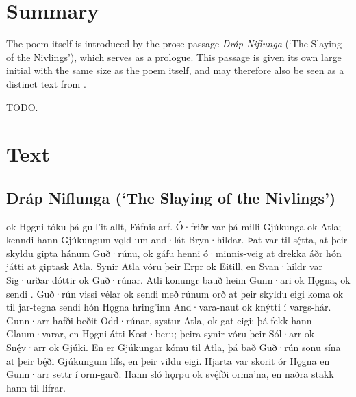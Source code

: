 \section{Summary}

The poem itself is introduced by the prose passage \emph{Dráp Niflunga} (‘The Slaying of the Nivlings’), which serves as a prologue.  This passage is given its own large initial with the same size as the poem itself, and may therefore also be seen as a distinct text from \GudrunTwo.

TODO.

\sectionline

\newpage

\section{Text}

\subsection{Dráp Niflunga (‘The Slaying of the Nivlings’)}

\bpg\bpa%
%
 ok Hǫgni tóku þá gull’it allt, Fáfnis arf. Ó·friðr var þá milli Gjúkunga ok Atla; kenndi hann Gjúkungum vǫld um and·lát Bryn·hildar. Þat var til sę́tta, at þeir skyldu gipta hánum Guð·rúnu, ok gáfu henni ó·minnis-veig at drekka áðr hón játti at giptask Atla. Synir Atla vóru þeir Erpr ok Eitill, en Svan·hildr var Sig·urðar dóttir ok Guð·rúnar. Atli konungr bauð heim Gunn·ari ok Hǫgna, ok sendi .  Guð·rún vissi vélar ok sendi með rúnum orð at þeir skyldu eigi koma ok til jar-tegna sendi hón Hǫgna hring’inn And·vara-naut ok knýtti í vargs-hár.  Gunn·arr hafði beðit Odd·rúnar, systur Atla, ok gat eigi; þá fekk hann Glaum·varar, en Hǫgni átti Kost·beru; þeira synir vóru þeir Sól·arr ok Snę́v·arr ok Gjúki.  En er Gjúkungar kómu til Atla, þá bað Guð·rún sonu sína at þeir bę́ði Gjúkungum lífs, en þeir vildu eigi.  Hjarta var skorit ór Hǫgna en Gunn·arr settr í orm-garð.  Hann sló hǫrpu ok svę́fði orma’na, en naðra stakk hann til lifrar.\epa

